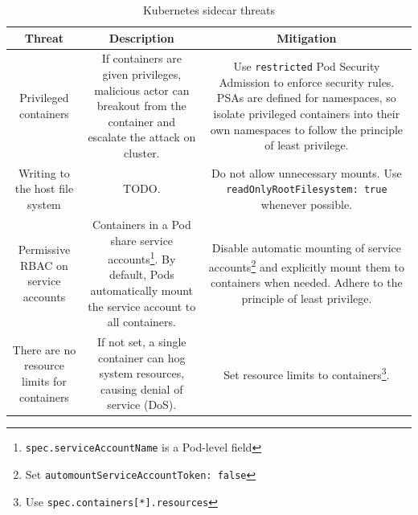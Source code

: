 \documentclass[english, 12pt, a4paper, sci, utf8, a-2b, online]{aaltothesis}
\begin{document}
\begin{table}[H]
  \sffamily
  \centering

  \caption{Kubernetes sidecar threats}
  \label{table:threat-model}

  \begin{minipage}{\textwidth}
  \renewcommand{\thempfootnote}{\arabic{mpfootnote}} %
  \begin{tabularx}{\textwidth}{CCC}
    \hline
    \textbf{Threat} & \textbf{Description} & \textbf{Mitigation} \\ \hline
    Privileged containers & If containers are given privileges, malicious actor can breakout from the container and escalate the attack on cluster. & Use \texttt{restricted} Pod Security Admission to enforce security rules. PSAs are defined for namespaces, so isolate privileged containers into their own namespaces to follow the principle of least privilege. \\ \hline
    Writing to the host file system & TODO. & Do not allow unnecessary mounts. Use \texttt{readOnlyRootFilesystem: true} whenever possible. \\ \hline
    Permissive RBAC on service accounts & Containers in a Pod share service accounts\footnote{\texttt{spec.serviceAccountName} is a Pod-level field}. By default, Pods automatically mount the service account to all containers. & Disable automatic mounting of service accounts\footnote{Set \texttt{automountServiceAccountToken: false}} and explicitly mount them to containers when needed. Adhere to the principle of least privilege. \\ \hline
    There are no resource limits for containers & If not set, a single container can hog system resources, causing denial of service (DoS). & Set resource limits to containers\footnote{Use \texttt{spec.containers[*].resources}}. \\ \hline
  \end{tabularx}
  \end{minipage}
\end{table}
\end{document}
